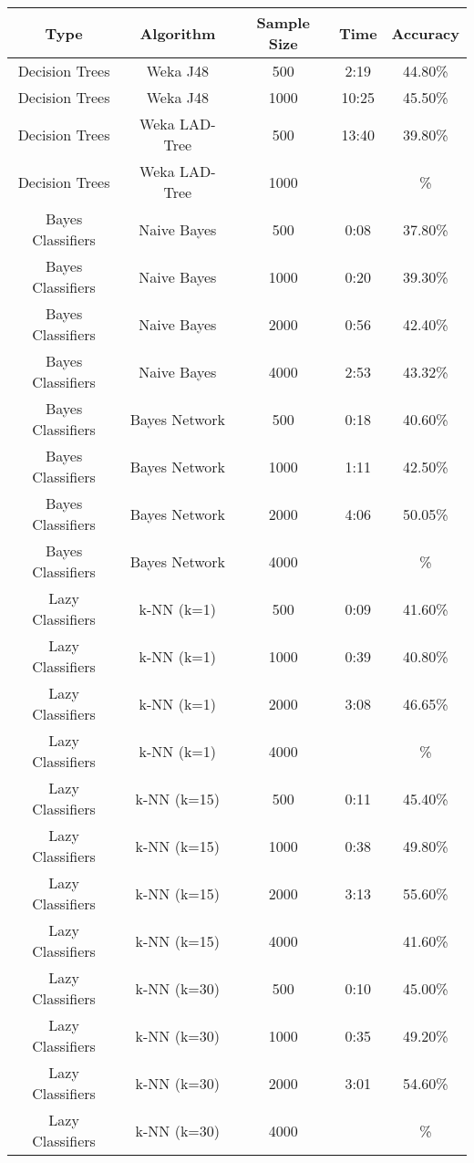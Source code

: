 \begin{tabular}{|c|c|c|c|c|}
\hline
Type     &       Algorithm    & Sample Size &  Time &  Accuracy   \\
\hline
\hline
Decision Trees & Weka J48      &   500  &   2:19  &    44.80\%  \\
Decision Trees & Weka J48      &  1000  &  10:25  &    45.50\%  \\
Decision Trees & Weka LAD-Tree &   500  &  13:40  &    39.80\%  \\
Decision Trees & Weka LAD-Tree &  1000  &         &         \%  \\

Bayes Classifiers & Naive Bayes &   500  &   0:08  &    37.80\%  \\
Bayes Classifiers & Naive Bayes &  1000  &   0:20  &    39.30\%  \\
Bayes Classifiers & Naive Bayes &  2000  &   0:56  &    42.40\%  \\
Bayes Classifiers & Naive Bayes &  4000  &   2:53  &    43.32\%  \\

Bayes Classifiers & Bayes Network &   500  &  0:18  &   40.60\%  \\
Bayes Classifiers & Bayes Network &  1000  &  1:11  &   42.50\%  \\
Bayes Classifiers & Bayes Network &  2000  &  4:06  &   50.05\%  \\
Bayes Classifiers & Bayes Network &  4000  &    &   \%  \\

Lazy Classifiers & k-NN (k=1) &   500  &   0:09  &    41.60\%  \\
Lazy Classifiers & k-NN (k=1) &  1000  &   0:39  &    40.80\%  \\
Lazy Classifiers & k-NN (k=1) &  2000  &   3:08  &    46.65\%  \\
Lazy Classifiers & k-NN (k=1) &  4000  &     &   \%  \\

Lazy Classifiers & k-NN (k=15) &   500  &   0:11  &    45.40\%  \\
Lazy Classifiers & k-NN (k=15) &  1000  &   0:38  &    49.80\%  \\
Lazy Classifiers & k-NN (k=15) &  2000  &   3:13  &    55.60\%  \\
Lazy Classifiers & k-NN (k=15) &  4000  &     &    41.60\%  \\

Lazy Classifiers & k-NN (k=30) &   500  &   0:10  &    45.00\%  \\
Lazy Classifiers & k-NN (k=30) &  1000  &   0:35  &    49.20\%  \\
Lazy Classifiers & k-NN (k=30) &  2000  &   3:01  &    54.60\%  \\
Lazy Classifiers & k-NN (k=30) &  4000  &     &    \%  \\


\end{tabular}
